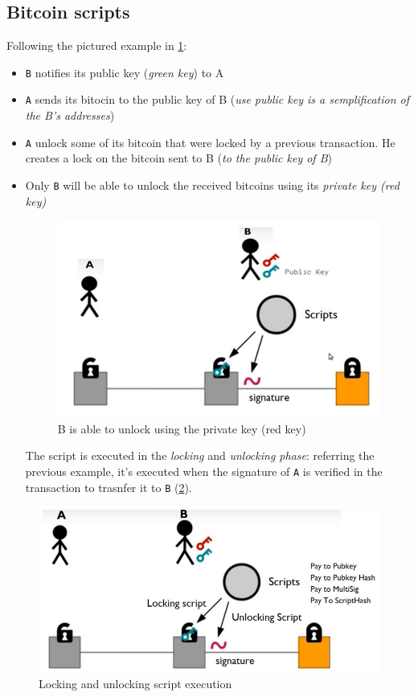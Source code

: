 \documentclass[10pt,a4paper]{report}
\begin{document}
\subsection{Bitcoin scripts}\label{sec:bitcoin-scripts}
Following the pictured example in \ref{btc-script1}:


\begin{itemize}
	\item 
	\texttt{B} notifies its public key (\textit{green key}) to A
	\item 
	\texttt{A} sends its bitocin to the public key of B (\textit{use public key is a semplification of the B's addresses})
	\item 
	\texttt{A} unlock some of its bitcoin that were locked by a previous transaction. He creates a lock on the bitcoin sent to B (\textit{to the public key of B})
	\item 
	Only \texttt{B} will be able to unlock the received bitcoins using its \textit{private key (red key)}
	\begin{figure}
		\centering
		\includegraphics[scale=0.50]{images/Pasted image 20230331141911.png}
		\caption{B is able to unlock using the private key (red key)}
\label{btc-script1}	
\end{figure}
	
	The script is executed in the \textit{locking} and \textit{unlocking phase}: referring the previous example, it's executed when the signature of \texttt{A} is verified in the transaction to trasnfer it to \texttt{B} (\ref{verified-transaction}).
\end{itemize}

\begin{figure}[h]
	\centering
	\includegraphics[scale=0.50]{images/Pasted image 20230331142136.png}
	\caption{Locking and unlocking script execution}
	\label{verified-transaction}
\end{figure}
\end{document}
